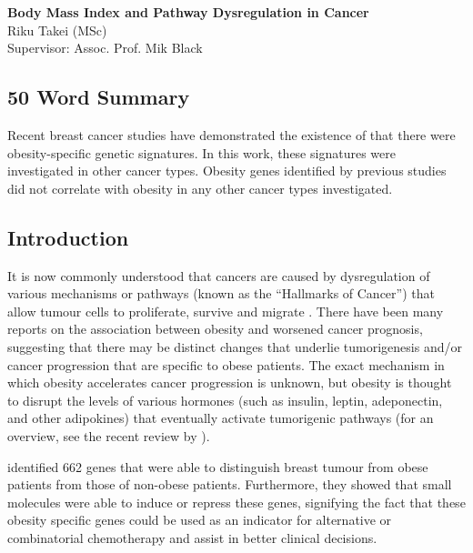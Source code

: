 \documentclass[12pt, a4paper]{article}
\begin{document}
\begin{center}
\Large{\textbf{Body Mass Index and Pathway Dysregulation in Cancer}}\\

\normalsize{
    Riku Takei (MSc)\\
        Supervisor: Assoc. Prof. Mik Black
}
\end{center}

\vspace{-30pt}

\subsection*{50 Word Summary}

Recent breast cancer studies have demonstrated the existence of that there were obesity-specific genetic signatures.
In this work, these signatures were investigated in other cancer types.
Obesity genes identified by previous studies did not correlate with obesity in any other cancer types investigated.


\vspace{-11pt}

\subsection*{Introduction}

It is now commonly understood that cancers are caused by dysregulation of various mechanisms or pathways (known as the ``Hallmarks of Cancer'') that allow tumour cells to proliferate, survive and migrate \citep{Hanahan2011}.
There have been many reports on the association between obesity and worsened cancer prognosis, suggesting that there may be distinct changes that underlie tumorigenesis and/or cancer progression that are specific to obese patients.
The exact mechanism in which obesity accelerates cancer progression is unknown, but obesity is thought to disrupt the levels of various hormones (such as insulin, leptin, adeponectin, and other adipokines) that eventually activate tumorigenic pathways (for an overview, see the recent review by \citet{Renehan2015}).

\citet{Creighton2012} identified 662 genes that were able to distinguish breast tumour from obese patients from those of non-obese patients.
Furthermore, they showed that small molecules were able to induce or repress these genes, signifying the fact that these obesity specific genes could be used as an indicator for alternative or combinatorial chemotherapy and assist in better clinical decisions.
\end{document}
